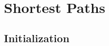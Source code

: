 \section{Shortest Paths}

\begin{comment}
      \subsection{Driver Interface}

      \andrew{I am not sure we should have the unified interface.  We need to be more parsimonious in our interfaces.  Users can read the documentation for which algorithms to use.  And, if they are using graph algorithms, we should assume a certain level of knowledge about graph algorithms.  OTOH, it is only a handful of algorithms.}

      \andrew{I am also not sure we should have ``shortest distance'' variants.  That doubles the number of functions in the interface.
            For each function we have shortest paths, s-t paths, multi-source paths, parallel = 6X variants for each base function.  If we add shortest distances, that will make 12X.  OTOH, we could consider not having s-t paths or not having multi-source paths -- which would leave 4X for each base function.  However, I think people will want s-t and multi-source.
      }
      \phil{\tcode{dijkstra_shortest_distances} includes predecessor and distances, so excluding \tcode{dijkstra_shortest_distances} won't impact 
      the user much.}


      {\small
            
      }

      \andrew{The variety of algorithms was inspired by networkx....  Which also had ``distance'' variants.}

      \phil{I assume \tcode{adjacency_list_graph} is the same as our \tcode{adjacency_list}. \tcode{bidirectional_adjacency_list_graph} is new; what to do with it?}
\end{comment}

\subsection{Initialization}

